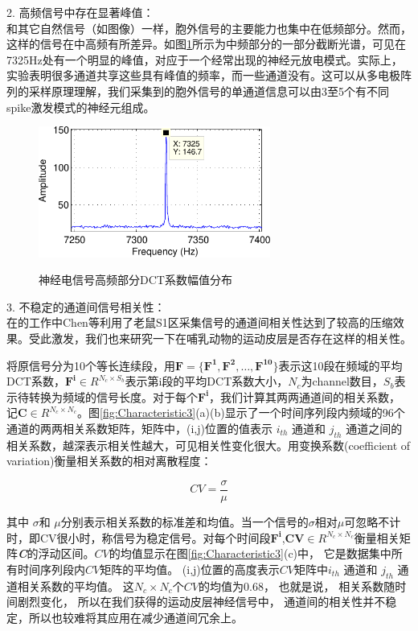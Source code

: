 2. 高频信号中存在显著峰值：\\
和其它自然信号（如图像）一样，胞外信号的主要能力也集中在低频部分。然而，这样的信号在中高频有所差异。如图\ref{Fig:Characteristic2}所示为中频部分的一部分截断光谱，可见在7325Hz处有一个明显的峰值，对应于一个经常出现的神经元放电模式。实际上，实验表明很多通道共享这些具有峰值的频率，而一些通道没有。这可以从多电极阵列的采样原理理解，我们采集到的胞外信号的单通道信息可以由3至5个有不同spike激发模式的神经元组成。

\begin{figure}[htb]
  \centering
  \includegraphics[width=3in]{Pictures/Compression/f2-crop.pdf}\\
  \caption{神经电信号高频部分DCT系数幅值分布}\label{Fig:Characteristic2}
\end{figure}


3. 不稳定的通道间信号相关性：\\
在\cite{chung2008intelligent}的工作中Chen等利用了老鼠S1区采集信号的通道间相关性达到了较高的压缩效果。受此激发，我们也来研究一下在哺乳动物的运动皮层是否存在这样的相关性。

将原信号分为10个等长连续段，用$\bm{F}=\bm{\{F^1, F^2,\ldots, F^{10}\}}$表示这10段在频域的平均DCT系数，$\bm{F^{i}}\in R^{N_c\times S_b}$表示第i段的平均DCT系数大小，$N_c$为channel数目，$S_b$表示待转换为频域的信号长度。对于每个$\bm{F^{i}}$，我们计算其两两通道间的相关系数，记$\bm{C} \in R^{N_c\times N_c}$。图\ref{fig:Characteristic3}(a)(b)显示了一个时间序列段内频域的96个通道的两两相关系数矩阵，矩阵中，(i,j)位置的值表示 $i_{th}$ 通道和 $j_{th}$ 通道之间的相关系数，越深表示相关性越大，可见相关性变化很大。用变换系数(coefficient of variation)衡量相关系数的相对离散程度：


\begin{equation}\label{Eq:CV Definition}
  CV=\frac{\sigma}{\mu}
\end{equation}


其中 $\sigma$和 $\mu$分别表示相关系数的标准差和均值。当一个信号的$\sigma$相对$\mu$可忽略不计时，即CV很小时，称信号为稳定信号。对每个时间段$\bm{F^{i}}$,$\bm{CV}\in R^{N_c\times N_c}$衡量相关矩阵\textbf{\emph{C}}的浮动区间。$CV$的均值显示在图\ref{fig:Characteristic3}(c)中， 它是数据集中所有时间序列段内$CV$矩阵的平均值。 (i,j)位置的高度表示$CV$矩阵中$i_{th}$ 通道和 $j_{th}$ 通道相关系数的平均值。 这$N_c\times N_c$个$CV$的均值为0.68， 也就是说， 相关系数随时间剧烈变化， 所以在我们获得的运动皮层神经信号中， 通道间的相关性并不稳定，所以也较难将其应用在减少通道间冗余上。


